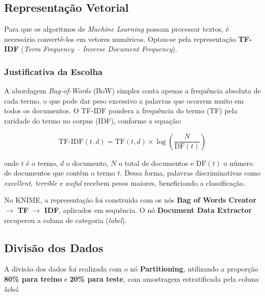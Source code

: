 \documentclass[12pt,a4paper]{article}
\begin{document}
\subsection{Representação Vetorial}

Para que os algoritmos de \textit{Machine Learning} possam processar textos, é necessário convertê-los em vetores numéricos. Optou-se pela representação \textbf{TF-IDF} (\textit{Term Frequency -- Inverse Document Frequency}).

\subsubsection*{Justificativa da Escolha}

A abordagem \textit{Bag-of-Words} (BoW) simples conta apenas a frequência absoluta de cada termo, o que pode dar peso excessivo a palavras que ocorrem muito em todos os documentos. O TF-IDF pondera a frequência do termo (TF) pela raridade do termo no corpus (IDF), conforme a equação:

\begin{equation}
\text{TF-IDF}(t, d) = \text{TF}(t, d) \times \log\left(\frac{N}{\text{DF}(t)}\right)
\end{equation}

\noindent onde $t$ é o termo, $d$ o documento, $N$ o total de documentos e $\text{DF}(t)$ o número de documentos que contêm o termo $t$. Dessa forma, palavras discriminativas como \textit{excellent}, \textit{terrible} e \textit{awful} recebem pesos maiores, beneficiando a classificação.

No KNIME, a representação foi construída com os nós \textbf{Bag of Words Creator} $\rightarrow$ \textbf{TF} $\rightarrow$ \textbf{IDF}, aplicados em sequência. O nó \textbf{Document Data Extractor} recuperou a coluna de categoria (\textit{label}).

\subsection{Divisão dos Dados}

A divisão dos dados foi realizada com o nó \textbf{Partitioning}, utilizando a proporção \textbf{80\% para treino} e \textbf{20\% para teste}, com amostragem estratificada pela coluna \textit{label}.
\end{document}
